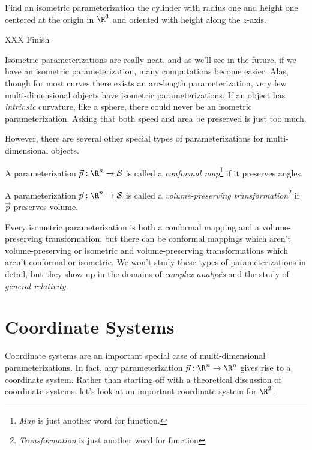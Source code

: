 \begin{example}
	Find an isometric parameterization the cylinder with radius one and height one centered at
	the origin in $\R^3$ and oriented with height along the $z$-axis.

	XXX Finish
\end{example}

Isometric parameterizations are really neat, and as we'll see in the future, if we have an isometric
parameterization, many computations become easier.  Alas, though for most curves there exists
an arc-length parameterization, very few multi-dimensional objects have isometric parameterizations.
If an object has \emph{intrinsic} curvature, like a sphere, there could never be an isometric parameterization.
Asking that both speed and area be preserved is just too much.

However, there are several other special types of parameterizations for multi-dimensional objects.

\begin{definition}
	A parameterization $\vec p:\R^n\to\mathcal S$ is called a \emph{conformal map}\footnote{ \emph{Map}
	is just another word for function.}
	if it preserves angles.
\end{definition}

\begin{definition}
	A parameterization $\vec p:\R^n\to\mathcal S$ is called a \emph{volume-preserving transformation}\footnote{ 
	\emph{Transformation} is just another word for function} if $\vec p$ preserves volume.
\end{definition}

Every isometric parameterization is both a conformal mapping and a volume-preserving transformation, but
there can be conformal mappings which aren't volume-preserving or isometric and volume-preserving transformations
which aren't conformal or isometric.  We won't study these types of parameterizations in detail, but
they show up in the domains of \emph{complex analysis} and the study of \emph{general relativity}.


\begin{exercises}
\end{exercises}

\section{Coordinate Systems}

Coordinate systems are an important special case of multi-dimensional parameterizations.
In fact, any parameterization $\vec p:\R^n\to\R^n$ gives rise to a coordinate system.  Rather than
starting off with a theoretical discussion of coordinate systems,
let's look at an
important coordinate system for $\R^2$.

